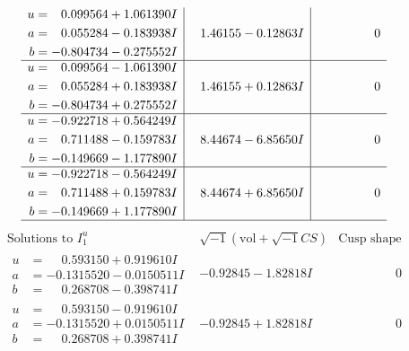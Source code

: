 \documentclass[1p]{elsarticle_modified}
\theoremstyle{definition}
\newcommand{\I}{\sqrt{-1}}
\begin{document}
$$\begin{array}{c|c|c}
\begin{aligned}
u &= \phantom{-}0.099564 + 1.061390 I \\
a &= \phantom{-}0.055284 - 0.183938 I \\
b &= -0.804734 - 0.275552 I\end{aligned}
 & \phantom{-}1.46155 - 0.12863 I & \phantom{-0.000000 } 0 \\ \hline\begin{aligned}
u &= \phantom{-}0.099564 - 1.061390 I \\
a &= \phantom{-}0.055284 + 0.183938 I \\
b &= -0.804734 + 0.275552 I\end{aligned}
 & \phantom{-}1.46155 + 0.12863 I & \phantom{-0.000000 } 0 \\ \hline\begin{aligned}
u &= -0.922718 + 0.564249 I \\
a &= \phantom{-}0.711488 - 0.159783 I \\
b &= -0.149669 - 1.177890 I\end{aligned}
 & \phantom{-}8.44674 - 6.85650 I & \phantom{-0.000000 } 0 \\ \hline\begin{aligned}
u &= -0.922718 - 0.564249 I \\
a &= \phantom{-}0.711488 + 0.159783 I \\
b &= -0.149669 + 1.177890 I\end{aligned}
 & \phantom{-}8.44674 + 6.85650 I & \phantom{-0.000000 } 0\\
 \hline 
 \end{array}$$\newpage$$\begin{array}{c|c|c}  
\text{Solutions to }I^u_{1}& \I (\text{vol} + \sqrt{-1}CS) & \text{Cusp shape}\\
 \hline 
\begin{aligned}
u &= \phantom{-}0.593150 + 0.919610 I \\
a &= -0.1315520 - 0.0150511 I \\
b &= \phantom{-}0.268708 - 0.398741 I\end{aligned}
 & -0.92845 - 1.82818 I & \phantom{-0.000000 } 0 \\ \hline\begin{aligned}
u &= \phantom{-}0.593150 - 0.919610 I \\
a &= -0.1315520 + 0.0150511 I \\
b &= \phantom{-}0.268708 + 0.398741 I\end{aligned}
 & -0.92845 + 1.82818 I & \phantom{-0.000000 } 0 \\ \hline\begin{aligned}

\end{aligned}
\end{array}$$
\end{document}
